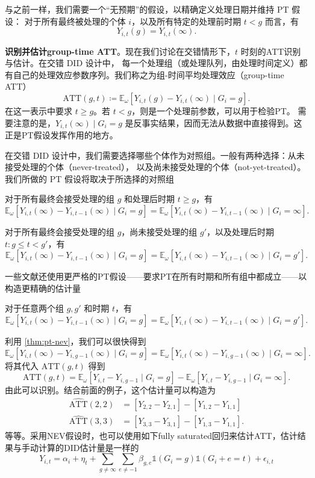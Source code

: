 \documentclass[../didNotes.tex]{subfiles}
\begin{document}
与之前一样，我们需要一个“无预期”的假设，以精确定义处理日期并维持 PT 假设：
对于所有最终被处理的个体 \( i \)，以及所有特定的处理前时期 \( t < g \) 而言，有
\[
  Y_{i,t}(g) = Y_{i,t}(\infty)
.\]

\textbf{识别并估计group-time ATT}。现在我们讨论在交错情形下，\( t \) 时刻的ATT识别与估计。在交错 DID 设计中，
每一个处理组（或处理队列，由处理时间定义）都有自己的处理效应参数序列。我们称之为组-时间平均处理效应（group-time ATT）
\[
  \text{ATT}(g,t) \coloneqq \mathbb{E}_{\omega}[Y_{i,t}(g)-Y_{i,t}(\infty) \mid G_i = g]
.\]
在这一表示中要求 \( t \ge g \)。若 \( t < g \)，则是一个处理前参数，可以用于检验PT。
需要注意的是，\( Y_{i,t}(\infty) \mid G_i=g \) 是反事实结果，因而无法从数据中直接得到。这正是PT假设发挥作用的地方。

在交错 DID 设计中，我们需要选择哪些个体作为对照组。一般有两种选择：从未接受处理的个体（never-treated），
以及尚未接受处理的个体（not-yet-treated）。我们所做的 PT 假设将取决于所选择的对照组
\begin{assumption}\label{thm:pt-nev}
  对于所有最终会接受处理的组 \( g \) 和处理后时期 \( t \ge g \)，有
  \[
    \mathbb{E}_{\omega}[Y_{i,t}(\infty)-Y_{i,t-1}(\infty) \mid G_i=g] =
    \mathbb{E}_{\omega}[Y_{i,t}(\infty)-Y_{i,t-1}(\infty) \mid G_i=\infty]
  .\]
\end{assumption}

\begin{assumption}\label{thm:pt-not-yet}
  对于所有最终会接受处理的组 \( g \)，尚未接受处理的组 \( g' \)，以及处理后时期
  \( t: g \le t < g' \)，有
  \[
    \mathbb{E}_{\omega}[Y_{i,t}(\infty)-Y_{i,t-1}(\infty) \mid G_i=g] =
    \mathbb{E}_{\omega}[Y_{i,t}(\infty)-Y_{i,t-1}(\infty) \mid G_i=g']
  .\]
\end{assumption}

一些文献还使用更严格的PT假设——要求PT在所有时期和所有组中都成立——以构造更精确的估计量
\begin{assumption}\label{thm:pt-all}
  对于任意两个组 \( g,g' \) 和时期 \( t \)，有
  \[
    \mathbb{E}_{\omega}[Y_{i,t}(\infty)-Y_{i,t-1}(\infty) \mid G_i=g] =
    \mathbb{E}_{\omega}[Y_{i,t}(\infty)-Y_{i,t-1}(\infty) \mid G_i=g']
  .\]
\end{assumption}

利用 \autoref{thm:pt-nev}，我们可以很快得到
\[
  \mathbb{E}_{\omega}[Y_{i,t}(\infty)-Y_{i,g-1}(\infty) \mid G_i=g] =
  \mathbb{E}_{\omega}[Y_{i,t}(\infty)-Y_{i,g-1}(\infty) \mid G_i=\infty]
.\]
将其代入 \( \text{ATT}(g,t) \) 得到
\[
  \text{ATT}(g,t) = \mathbb{E}_{\omega}[Y_{i,t}-Y_{i,g-1} \mid G_i=g] -
  \mathbb{E}_{\omega}[Y_{i,t}-Y_{i,g-1} \mid G_i=\infty]
.\]
由此可以识别。结合前面的例子，这个估计量可以构造为
\begin{align*}
  \widehat{\text{ATT}}(2,2) & =[Y_{2,2}-Y_{2,1}] - [Y_{1,2}-Y_{1,1}] \\
  \widehat{\text{ATT}}(3,3) & =[Y_{3,3}-Y_{3,1}] - [Y_{1,3}-Y_{1,1}]
  .
\end{align*}
等等。采用NEV假设时，也可以使用如下fully saturated回归来估计ATT，估计结果与手动计算的DID估计量是一样的
$$
Y_{i,t} = \alpha_{i} + \eta_{t} + \sum_{g \neq \infty} \sum_{e \neq -1} \beta_{g,e} \mathbb{1} (G_{i}=g)
\mathbb{1}(G_{i}+e=t) + \epsilon_{i,t}
$$
\end{document}
